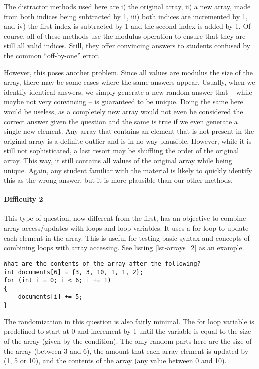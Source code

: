 \documentclass{article}
\begin{document}
The distractor methods used here are i) the original array, ii) a new array, made from both indices being subtracted by 1, iii) both indices are incremented by 1, and iv) the first index is
subtracted by 1 and the second index is added by 1. Of course, all of these methods use the modulus operation to ensure that they are still all valid indices. Still, they offer convincing 
answers to students confused by the common ``off-by-one'' error. 

However, this poses another problem. Since all values are modulus the size of the array, there may be some cases where the same answers appear. Usually, when we identify identical answers,
we simply generate a new random answer that -- while maybe not very convincing -- is guaranteed to be unique. Doing the same here would be useless, as a completely new array would not
even be considered the correct answer given the question and the same is true if we even generate a single new element. Any array that contains an element that is not present in the 
original array is a definite outlier and is in no way plausible. However, while it is still not sophisticated, a last resort may be shuffling the order of the original array. This way, it still contains all
values of the original array while being unique. Again, any student familiar with the material is likely to quickly identify this as the wrong answer, but it is more plausible than our other methods.

\paragraph{Difficulty 2} \hfill \par

This type of question, now different from the first, has an objective to combine array access/updates with loops and loop variables. It uses a for loop to update each element in the array. This is
useful for testing basic syntax and concepts of combining loops with array accessing. See listing \ref{lst-arrays_2} as an example. 

\begin{lstlisting}[caption={\textbf{Arrays} Difficulty 2 Example}, label=lst-arrays_2, float]
What are the contents of the array after the following?
int documents[6] = {3, 3, 10, 1, 1, 2};
for (int i = 0; i < 6; i += 1)
{ 
	documents[i] += 5; 
} 
\end{lstlisting}


The randomization in this question is also fairly minimal. The for loop variable is predefined to start at 0 and increment by 1 until the variable is equal to the size of the array (given by the 
condition). The only random parts here are the size of the array (between 3 and 6), the amount that each array element is updated by (1, 5 or 10), and the contents of the array (any value 
between 0 and 10). 
\end{document}

